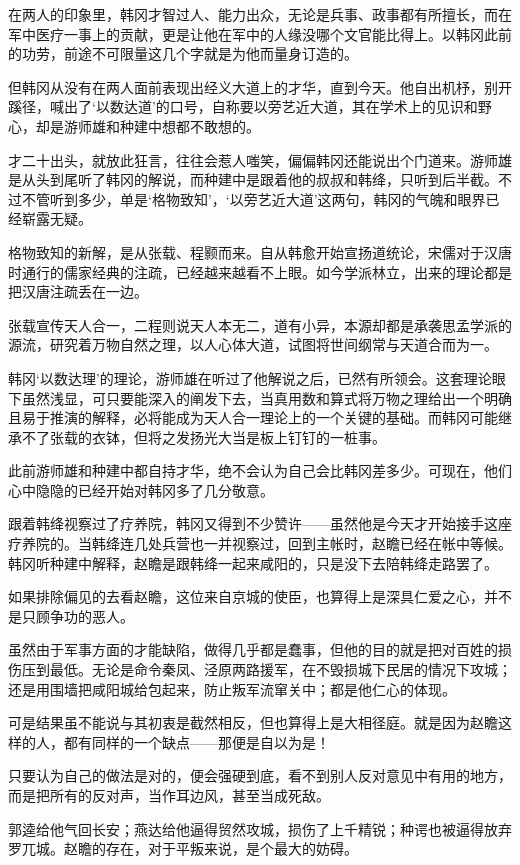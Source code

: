在两人的印象里，韩冈才智过人、能力出众，无论是兵事、政事都有所擅长，而在军中医疗一事上的贡献，更是让他在军中的人缘没哪个文官能比得上。以韩冈此前的功劳，前途不可限量这几个字就是为他而量身订造的。

但韩冈从没有在两人面前表现出经义大道上的才华，直到今天。他自出机杼，别开蹊径，喊出了‘以数达道’的口号，自称要以旁艺近大道，其在学术上的见识和野心，却是游师雄和种建中想都不敢想的。

才二十出头，就放此狂言，往往会惹人嗤笑，偏偏韩冈还能说出个门道来。游师雄是从头到尾听了韩冈的解说，而种建中是跟着他的叔叔和韩绛，只听到后半截。不过不管听到多少，单是‘格物致知’，‘以旁艺近大道’这两句，韩冈的气魄和眼界已经崭露无疑。

格物致知的新解，是从张载、程颢而来。自从韩愈开始宣扬道统论，宋儒对于汉唐时通行的儒家经典的注疏，已经越来越看不上眼。如今学派林立，出来的理论都是把汉唐注疏丢在一边。

张载宣传天人合一，二程则说天人本无二，道有小异，本源却都是承袭思孟学派的源流，研究着万物自然之理，以人心体大道，试图将世间纲常与天道合而为一。

韩冈‘以数达理’的理论，游师雄在听过了他解说之后，已然有所领会。这套理论眼下虽然浅显，可只要能深入的阐发下去，当真用数和算式将万物之理给出一个明确且易于推演的解释，必将能成为天人合一理论上的一个关键的基础。而韩冈可能继承不了张载的衣钵，但将之发扬光大当是板上钉钉的一桩事。

此前游师雄和种建中都自持才华，绝不会认为自己会比韩冈差多少。可现在，他们心中隐隐的已经开始对韩冈多了几分敬意。

跟着韩绛视察过了疗养院，韩冈又得到不少赞许——虽然他是今天才开始接手这座疗养院的。当韩绛连几处兵营也一并视察过，回到主帐时，赵瞻已经在帐中等候。韩冈听种建中解释，赵瞻是跟韩绛一起来咸阳的，只是没下去陪韩绛走路罢了。

如果排除偏见的去看赵瞻，这位来自京城的使臣，也算得上是深具仁爱之心，并不是只顾争功的恶人。

虽然由于军事方面的才能缺陷，做得几乎都是蠢事，但他的目的就是把对百姓的损伤压到最低。无论是命令秦凤、泾原两路援军，在不毁损城下民居的情况下攻城；还是用围墙把咸阳城给包起来，防止叛军流窜关中；都是他仁心的体现。

可是结果虽不能说与其初衷是截然相反，但也算得上是大相径庭。就是因为赵瞻这样的人，都有同样的一个缺点——那便是自以为是！

只要认为自己的做法是对的，便会强硬到底，看不到别人反对意见中有用的地方，而是把所有的反对声，当作耳边风，甚至当成死敌。

郭逵给他气回长安；燕达给他逼得贸然攻城，损伤了上千精锐；种谔也被逼得放弃罗兀城。赵瞻的存在，对于平叛来说，是个最大的妨碍。

